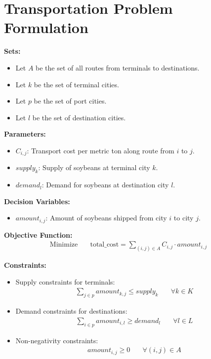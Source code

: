 \documentclass{article}
\begin{document}
\section*{Transportation Problem Formulation}

\textbf{Sets:}
\begin{itemize}
    \item Let \( A \) be the set of all routes from terminals to destinations.
    \item Let \( k \) be the set of terminal cities.
    \item Let \( p \) be the set of port cities.
    \item Let \( l \) be the set of destination cities.
\end{itemize}

\textbf{Parameters:}
\begin{itemize}
    \item \( C_{i,j} \): Transport cost per metric ton along route from \( i \) to \( j \).
    \item \( supply_k \): Supply of soybeans at terminal city \( k \).
    \item \( demand_l \): Demand for soybeans at destination city \( l \).
\end{itemize}

\textbf{Decision Variables:}
\begin{itemize}
    \item \( amount_{i,j} \): Amount of soybeans shipped from city \( i \) to city \( j \).
\end{itemize}

\textbf{Objective Function:}
\begin{align*}
\text{Minimize} \quad & \text{total\_cost} = \sum_{(i,j) \in A} C_{i,j} \cdot amount_{i,j}
\end{align*}

\textbf{Constraints:}
\begin{itemize}
    \item Supply constraints for terminals:
    \begin{align*}
    \sum_{j \in p} amount_{k,j} \leq supply_k & \quad \forall k \in K
    \end{align*}
    
    \item Demand constraints for destinations:
    \begin{align*}
    \sum_{i \in p} amount_{i,l} \geq demand_l & \quad \forall l \in L
    \end{align*}
    
    \item Non-negativity constraints:
    \begin{align*}
    amount_{i,j} \geq 0 & \quad \forall (i,j) \in A
    \end{align*}
\end{itemize}
\end{document}
